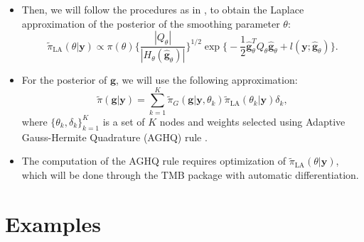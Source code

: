 \documentclass{beamer} %
\begin{document}
\begin{frame}


\begin{itemize}
\pause
\item Then, we will follow the procedures as in \cite{tierney1986accurate}, to obtain the Laplace approximation of the posterior of the smoothing parameter $\theta$:
\begin{equation}\label{LaplaceApproxi}
\tilde{\pi}_\text{LA}(\theta|\boldsymbol{y}) \propto \pi(\theta) \bigg\{\frac{|Q_\theta|}{|H_\theta(\hat{\boldsymbol{g}}_\theta)|} \bigg\}^{1/2} \exp \bigg\{ -\frac{1}{2}  \hat{\boldsymbol{g}}_\theta^T Q_\theta  \hat{\boldsymbol{g}}_\theta + l(\boldsymbol{y};\hat{\boldsymbol{g}}_\theta) \bigg\}.
\end{equation}

\pause
\item For the posterior of $\boldsymbol{g}$, we will use the following approximation:
\begin{equation}\label{finalApproxi}
\tilde{\pi}(\boldsymbol{g}|\boldsymbol{y}) = \sum_{k=1}^K \tilde{\pi}_G(\boldsymbol{g}|\boldsymbol{y}, \theta_k) \tilde{\pi}_{\text{LA}}(\theta_k|\boldsymbol{y}) \delta_k,
\end{equation}
where $\{\theta_k, \delta_k\}_{k=1}^K$ is a set of $K$ nodes and weights selected using Adaptive Gauss-Hermite Quadrature (AGHQ) rule \citep{aghq}. 
\pause
\item The computation of the AGHQ rule requires optimization of $\tilde{\pi}_\text{LA}(\theta|\boldsymbol{y})$, which will be done through the TMB package \citep{kristensen2015tmb} with automatic differentiation.


\end{itemize}

\end{frame}

\section{Examples}
\end{document}
